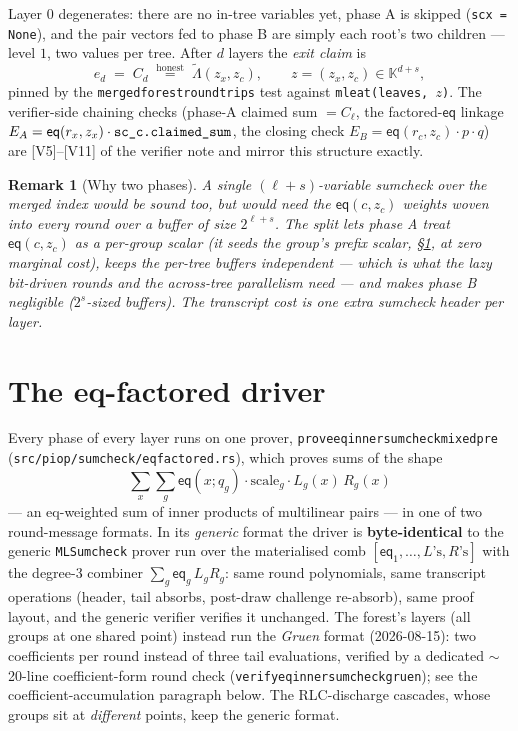 \documentclass[11pt]{article}
\newcommand{\K}{\mathbb{K}}            %
\newcommand{\mle}[1]{\widetilde{#1}}
\newcommand{\eq}{\mathsf{eq}}
\newcommand{\code}[1]{{\def\_{\textunderscore\allowbreak}\texttt{#1}}}
\newtheorem{remark}{Remark}
\theoremstyle{definition}
\begin{document}
Layer $0$ degenerates: there are no in-tree variables yet, phase A is
skipped (\code{sc\_x = None}), and the pair vectors fed to phase B are
simply each root's two children --- level $1$, two values per tree.
After $d$ layers the \emph{exit claim} is
\[
  e_d \;=\; C_d \;\overset{\text{honest}}{=}\;
  \mle{\Lambda}(z_x, z_c),
  \qquad z = (z_x, z_c) \in \K^{d+s},
\]
pinned by the \code{merged\_forest\_roundtrips} test against
\code{mle\_at(leaves, $z$)}.  The verifier-side chaining checks (phase-A
claimed sum $= C_\ell$, the factored-$\eq$ linkage
$E_A = \eq(r_x, z_x)\cdot\code{sc\_c.claimed\_sum}$, the closing check
$E_B = \eq(r_c, z_c)\cdot p\cdot q$) are [V5]--[V11] of the verifier
note and mirror this structure exactly.

\begin{remark}[Why two phases]
A single $(\ell + s)$-variable sumcheck over the merged index would be
sound too, but would need the $\eq(c, z_c)$ weights woven into every
round over a buffer of size $2^{\ell + s}$.  The split lets phase A
treat $\eq(c, z_c)$ as a per-group \emph{scalar} (it seeds the group's
prefix scalar, \S\ref{sec:driver}, at zero marginal cost), keeps the
per-tree buffers independent --- which is what the lazy bit-driven
rounds and the across-tree parallelism need --- and makes phase B
negligible ($2^s$-sized buffers).  The transcript cost is one extra
sumcheck header per layer.
\end{remark}

\section{The eq-factored driver}
\label{sec:driver}

Every phase of every layer runs on one prover,
\code{prove\_eq\_inner\_sumcheck\_mixed\_pre}
(\code{src/piop/sumcheck/eq\_factored.rs}), which proves sums of the
shape
\[
  \sum_{x} \sum_{g} \eq(x; q_g)\cdot \mathrm{scale}_g \cdot
  L_g(x)\,R_g(x)
\]
--- an eq-weighted sum of inner products of multilinear pairs --- in one
of two round-message formats.  In its \emph{generic} format the driver
is \textbf{byte-identical} to the generic \code{MLSumcheck} prover run
over the materialised comb $[\eq_1, \dots, L\text{'s}, R\text{'s}]$ with
the degree-3 combiner $\sum_g \eq_g\, L_g R_g$: same round polynomials,
same transcript operations (header, tail absorbs, post-draw challenge
re-absorb), same proof layout, and the generic verifier verifies it
unchanged.  The forest's layers (all groups at one shared point) instead
run the \emph{Gruen} format (2026-08-15): two coefficients per round
instead of three tail evaluations, verified by a dedicated
${\sim}$20-line coefficient-form round check
(\code{verify\_eq\_inner\_sumcheck\_gruen}); see the
coefficient-accumulation paragraph below.  The RLC-discharge cascades,
whose groups sit at \emph{different} points, keep the generic format.
\end{document}
